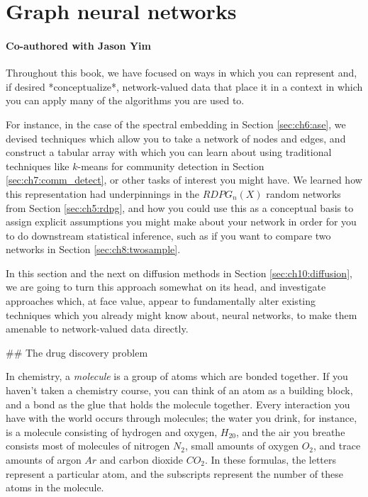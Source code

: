 \section{Graph neural networks}
\label{sec:ch10:gnns}
\paragraph*{Co-authored with Jason Yim}

Throughout this book, we have focused on ways in which you can represent and, if desired *conceptualize*, network-valued data that place it in a context in which you can apply many of the algorithms you are used to. 

For instance, in the case of the spectral embedding in Section \ref{sec:ch6:ase}, we devised techniques which allow you to take a network of nodes and edges, and construct a tabular array with which you can learn about using traditional techniques like $k$-means for community detection in Section \ref{sec:ch7:comm_detect}, or other tasks of interest you might have. We learned how this representation had underpinnings in the $RDPG_n(X)$ random networks from Section \ref{sec:ch5:rdpg}, and how you could use this as a conceptual basis to assign explicit assumptions you might make about your network in order for you to do downstream statistical inference, such as if you want to compare two networks in Section \ref{sec:ch8:twosample}. 

In this section and the next on diffusion methods in Section \ref{sec:ch10:diffusion}, we are going to turn this approach somewhat on its head, and investigate approaches which, at face value, appear to fundamentally alter existing techniques which you already might know about, neural networks, to make them amenable to network-valued data directly.

## The drug discovery problem

In chemistry, a \textit{molecule} is a group of atoms which are bonded together. If you haven't taken a chemistry course, you can think of an atom as a building block, and a bond as the glue that holds the molecule together. Every interaction you have with the world occurs through molecules; the water you drink, for instance, is a molecule consisting of hydrogen and oxygen, $H_20$, and the air you breathe consists most of molecules of nitrogen $N_2$, small amounts of oxygen $O_2$, and trace amounts of argon $Ar$ and carbon dioxide $CO_2$. In these formulas, the letters represent a particular atom, and the subscripts represent the number of these atoms in the molecule.

